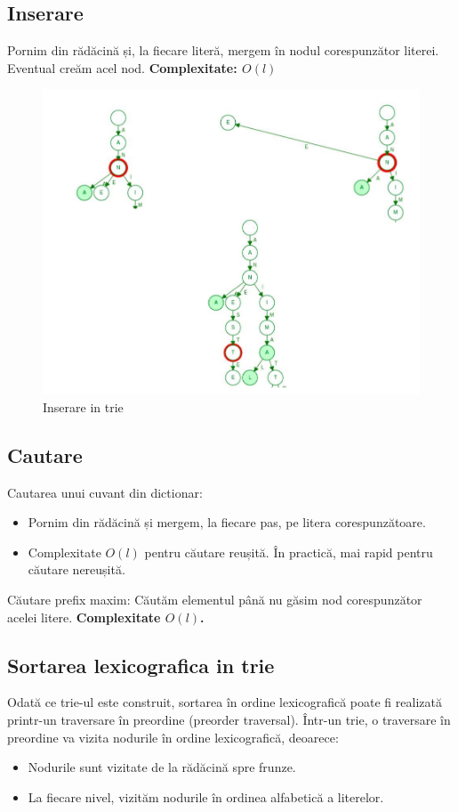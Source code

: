 \documentclass[11pt,a4paper]{article}
\theoremstyle{definition}
\theoremstyle{plain}
\theoremstyle{remark}
\begin{document}
\subsection*{Inserare}
Pornim din rădăcină și, la ﬁecare literă, mergem în nodul corespunzător literei. Eventual creăm acel nod. \textbf{Complexitate: $O(l)$}

\begin{figure}[H]
    \centering
    \includegraphics[width=0.75\linewidth]{insert-trie.png}
    \caption{Inserare in trie}
    \label{fig:enter-label}
\end{figure}

\subsection*{Cautare}

Cautarea unui cuvant din dictionar:
\begin{itemize}
    \item Pornim din rădăcină și mergem, la ﬁecare pas, pe litera corespunzătoare.
    \item Complexitate $O(l)$ pentru căutare reușită.
    În practică, mai rapid pentru căutare nereușită.
\end{itemize}

Căutare preﬁx maxim: Căutăm elementul până nu găsim nod corespunzător acelei litere. \textbf{Complexitate $O(l)$.}

\subsection*{Sortarea lexicografica in trie}
Odată ce trie-ul este construit, sortarea în ordine lexicografică poate fi realizată printr-un traversare în preordine (preorder traversal). Într-un trie, o traversare în preordine va vizita nodurile în ordine lexicografică, deoarece:

\begin{itemize}
    \item Nodurile sunt vizitate de la rădăcină spre frunze.
    \item La fiecare nivel, vizităm nodurile în ordinea alfabetică a literelor.
\end{itemize}
\end{document}
